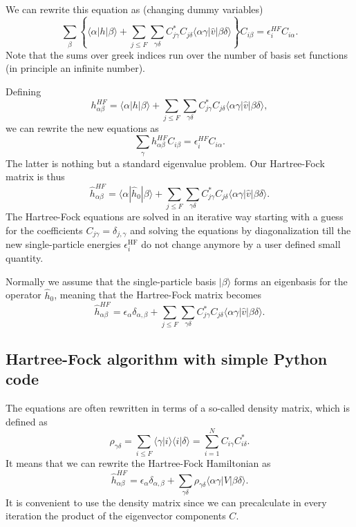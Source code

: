 We can rewrite this equation as (changing dummy variables)
\[
\sum_{\beta} \left\{\langle \alpha | h | \beta \rangle+
\sum_{j\le F}\sum_{\gamma\delta} C^*_{j\gamma}C_{j\delta}\langle
\alpha\gamma|\hat{v}|\beta\delta\rangle\right\}C_{i\beta}=\epsilon_i^{HF}C_{i\alpha}.
\]
Note that the sums over greek indices run over the number of basis set
functions (in principle an infinite number).

Defining
\[
h_{\alpha\beta}^{HF}=\langle \alpha | h | \beta \rangle+
\sum_{j\le F}\sum_{\gamma\delta} C^*_{j\gamma}C_{j\delta}\langle
\alpha\gamma|\hat{v}|\beta\delta\rangle,
\]
we can rewrite the new equations as
\begin{equation}
\sum_{\gamma}h_{\alpha\beta}^{HF}C_{i\beta}=\epsilon_i^{HF}C_{i\alpha}. \label{eq:newhf}
\end{equation}
The latter is nothing but a standard eigenvalue problem.  Our
Hartree-Fock matrix is thus
\[
\hat{h}_{\alpha\beta}^{HF}=\langle \alpha | \hat{h}_0 | \beta \rangle+
\sum_{j\le F}\sum_{\gamma\delta} C^*_{j\gamma}C_{j\delta}\langle
\alpha\gamma|\hat{v}|\beta\delta\rangle.
\]
The Hartree-Fock equations are solved in an iterative way starting
with a guess for the coefficients $C_{j\gamma}=\delta_{j,\gamma}$ and
solving the equations by diagonalization till the new single-particle
energies $\epsilon_i^{\mathrm{HF}}$ do not change anymore by a
user defined small  quantity.

Normally we assume that the single-particle basis $|\beta\rangle$
forms an eigenbasis for the operator $\hat{h}_0$, meaning that the
Hartree-Fock matrix becomes
\[
\hat{h}_{\alpha\beta}^{HF}=\epsilon_{\alpha}\delta_{\alpha,\beta}+
\sum_{j\le F}\sum_{\gamma\delta} C^*_{j\gamma}C_{j\delta}\langle
\alpha\gamma|\hat{v}|\beta\delta\rangle.
\]

\subsection{Hartree-Fock algorithm with simple Python code}

The equations are often rewritten in terms of a so-called density matrix,
which is defined as 
\begin{equation}
\rho_{\gamma\delta}=\sum_{i\le F}\langle\gamma|i\rangle\langle i|\delta\rangle = \sum_{i=1}^{N}C_{i\gamma}C^*_{i\delta}.
\end{equation}
It means that we can rewrite the Hartree-Fock Hamiltonian as
\[
\hat{h}_{\alpha\beta}^{HF}=\epsilon_{\alpha}\delta_{\alpha,\beta}+
\sum_{\gamma\delta} \rho_{\gamma\delta}\langle \alpha\gamma|V|\beta\delta\rangle.
\]
It is convenient to use the density matrix since we can precalculate in every iteration the product of the eigenvector components $C$. 

